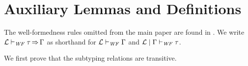 \section{Auxiliary Lemmas and Definitions}
\label{sec:aux-defn-lem}



The well-formedness rules omitted from the main paper are found in . We write
$ \mathcal{L}   \vdash _{\mathit{WF}}  \tau   \operatorname{\Rightarrow}   \Gamma $ as shorthand for $ \mathcal{L}   \vdash _{\mathit{WF}}  \Gamma $ and $ \mathcal{L}   \mid   \Gamma   \vdash _{\mathit{WF}}  \tau $.

We first prove that the subtyping relations are transitive.


